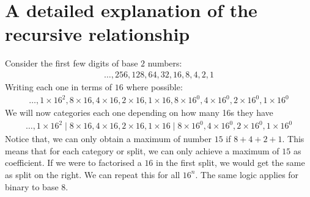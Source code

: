 \documentclass[a4paper]{article}
\theoremstyle{plain}
\theoremstyle{definition}
\theoremstyle{remark}
\begin{document}
\section{A detailed explanation of the recursive relationship}
Consider the first few digits of base $2$ numbers:
\begin{align*}
	\ldots,256,128,64,32,16,8,4,2,1
	\end{align*}
Writing each one in terms of $16$ where possible:
\begin{align*}
\ldots,1 \times 16^2,8 \times 16, 4 \times 16, 2 \times 16, 1 \times 16, 8 \times 16^{0}, 4 \times 16^0, 2 \times 16^{0}, 1 \times 16^{0}
\end{align*}
We will now categories each one depending on how many 16s they have
\begin{align*}
\ldots,1\times{16}^2  \mid 8 \times 16, 4 \times 16, 2 \times 16, 1 \times 16  \mid 8 \times 16^{0},4 \times 16^{0},2 \times 16^{0},1 \times 16 ^{0}
\end{align*} Notice that, we can only obtain a maximum of number $15$ if $8+4+2+1$. This means that for each category or split, we can only achieve a maximum of $15$ as coefficient. If we were to factorised a $16$ in the first split, we would get the same as split on the right. We can repeat this for all $16^{n}$. The same logic applies for binary to base $8$.
\end{document}
